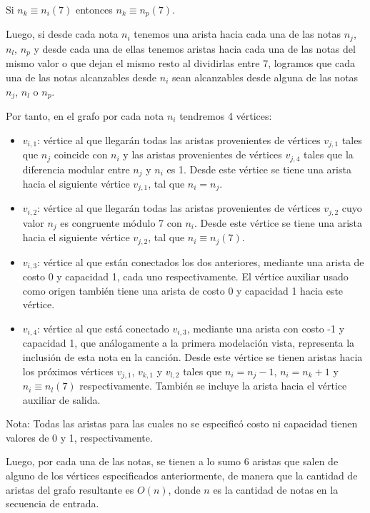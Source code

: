 \documentclass{article}
\begin{document}
Si $n_{k}\equiv n_{i}(7)$ entonces $n_{k}\equiv n_{p}(7)$.

Luego, si desde cada nota $n_{i}$ tenemos una arista hacia cada una de las notas $n_{j}$, $n_{l}$, $n_{p}$ y desde cada una de ellas tenemos aristas hacia cada una de las notas del mismo valor o que dejan el mismo resto al dividirlas entre 7, logramos que cada una de las notas alcanzables desde $n_{i}$ sean alcanzables desde alguna de las notas $n_{j}$, $n_{l}$ o $n_{p}$.

Por tanto, en el grafo por cada nota $n_{i}$ tendremos 4 vértices:
\begin{itemize}
    \item $v_{i,1}$: vértice al que llegarán todas las aristas provenientes de vértices $v_{j,1}$ tales que $n_{j}$ coincide con $n_{i}$ y las aristas provenientes de vértices $v_{j,4}$ tales que la diferencia modular entre $n_{j}$ y $n_{i}$ es 1. Desde este vértice se tiene una arista hacia el siguiente vértice $v_{j,1}$, tal que $n_{i} = n_{j}$.
    
    \item $v_{i,2}$: vértice al que llegarán todas las aristas provenientes de vértices $v_{j,2}$ cuyo valor $n_{j}$ es congruente módulo 7 con $n_{i}$. Desde este vértice se tiene una arista hacia el siguiente vértice $v_{j,2}$, tal que $n_{i} \equiv n_{j} (7)$.
    
    \item $v_{i,3}$: vértice al que están conectados los dos anteriores, mediante una arista de costo 0 y capacidad 1, cada uno respectivamente. El vértice auxiliar usado como origen también tiene una arista de costo 0 y capacidad 1 hacia este vértice.
    
    \item $v_{i,4}$: vértice al que está conectado $v_{i,3}$, mediante una arista con costo -1 y capacidad 1, que análogamente a la primera modelación vista, representa la inclusión de esta nota en la canción. Desde este vértice se tienen aristas hacia los próximos vértices $v_{j,1}$, $v_{k,1}$ y $v_{l,2}$ tales que $n_{i}=n_{j}-1$, $n_{i}=n_{k}+1$ y $n_{i} \equiv n_{l}(7)$ respectivamente. También se incluye la arista hacia el vértice auxiliar de salida.
\end{itemize}

Nota: Todas las aristas para las cuales no se especificó costo ni capacidad tienen valores de 0 y 1, respectivamente.

Luego, por cada una de las notas, se tienen a lo sumo 6 aristas que salen de alguno de los vértices especificados anteriormente, de manera que la cantidad de aristas del grafo resultante es $O(n)$, donde $n$ es la cantidad de notas en la secuencia de entrada.
\end{document}
